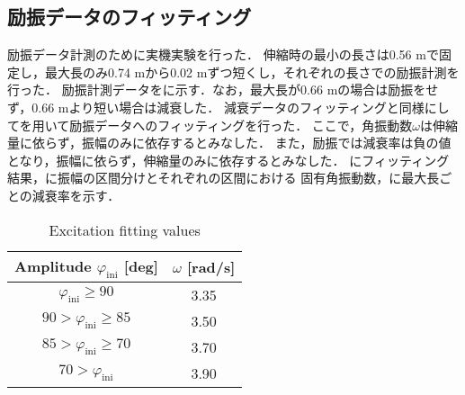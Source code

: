           \subsection{励振データのフィッティング}
            
            励振データ計測のために実機実験を行った．
            伸縮時の最小の長さは0.56 mで固定し，最大長のみ0.74 mから0.02 mずつ短くし，それぞれの長さでの励振計測を行った．
            励振計測データを\figref{}に示す．なお，最大長が0.66 mの場合は励振をせず，0.66 mより短い場合は減衰した．
            減衰データのフィッティングと同様にしてを用いて励振データへのフィッティングを行った．
            ここで，角振動数$\omega$は伸縮量に依らず，振幅のみに依存するとみなした．
            また，励振では減衰率は負の値となり，振幅に依らず，伸縮量のみに依存するとみなした．
            \figref{}にフィッティング結果，に振幅の区間分けとそれぞれの区間における
            固有角振動数，に最大長ごとの減衰率を示す．
            \begin{table}[tb]
              \begin{center}
                \caption{Excitation fitting values}
                \vspace{2mm}
                \begin{tabular}{c|c}
                  \hline
                  Amplitude $\varphi_{\mathrm{ini}}$ [deg] & $\omega$ [rad/s]\\
                  \hline
                  $\varphi_{\mathrm{ini}}\ge90$ & 3.35 \\
                  $90>\varphi_{\mathrm{ini}}\ge85$ & 3.50 \\
                  $85>\varphi_{\mathrm{ini}}\ge70$ & 3.70 \\
                  $70>\varphi_{\mathrm{ini}}$ & 3.90 \\                   
                  \hline
                \end{tabular}
              \end{center}
            \end{table}

